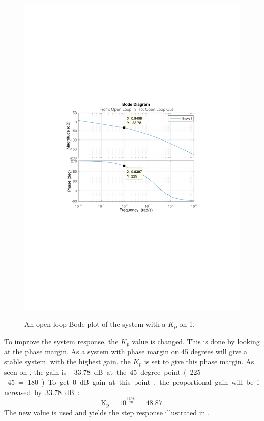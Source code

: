 \begin{figure}[H]
  \centering
  {
    \includegraphics[width=1.4\textwidth]{figures/distanceBode1.pdf}
  }
  \caption{An open loop Bode plot of the system with a $K_p$ on 1.}
  \label{SimulationSteeringB1}
\end{figure}\vspace{-5mm}

To improve the system response, the $K_p$ value is changed. This is done by looking at the phase margin. As a system with phase margin on 45 degrees will give a stable system, with the highest gain, the $K_p$ is set to give this phase margin. As seen on , the gain is \SI{-33,78}dB at the 45 degree point (225-45=180). To get 0 dB gain at this point, the proportional gain will be increased by  \SI{33,78}dB:
$$\text{K}_\text{p}=10^{\frac{\SI{33,78}{}}{20}} = \SI{48,87}{}$$
\newpage
The new value is used and yields the step response illustrated in .

